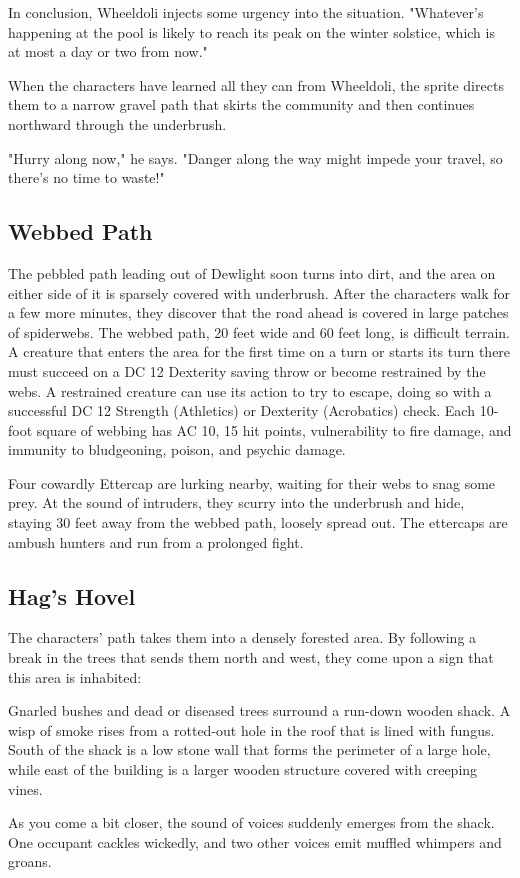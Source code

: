 \documentclass[10pt,a4paper,twoside,bg=print,twocolumn,openany,nodeprecatedcode]{dndbook}
\begin{document}
In conclusion, Wheeldoli injects some urgency into the situation. "Whatever's happening at the pool is likely to reach its peak on the winter solstice, which is at most a day or two from now."

When the characters have learned all they can from Wheeldoli, the sprite directs them to a narrow gravel path that skirts the community and then continues northward through the underbrush.

"Hurry along now," he says. "Danger along the way might impede your travel, so there's no time to waste!"

\subsection{Webbed Path}
The pebbled path leading out of Dewlight soon turns into dirt, and the area on either side of it is sparsely covered with underbrush. After the characters walk for a few more minutes, they discover that the road ahead is covered in large patches of spiderwebs. The webbed path, 20 feet wide and 60 feet long, is difficult terrain. A creature that enters the area for the first time on a turn or starts its turn there must succeed on a DC 12 Dexterity saving throw or become restrained by the webs. A restrained creature can use its action to try to escape, doing so with a successful DC 12 Strength (Athletics) or Dexterity (Acrobatics) check. Each 10-foot square of webbing has AC 10, 15 hit points, vulnerability to fire damage, and immunity to bludgeoning, poison, and psychic damage.

Four cowardly Ettercap are lurking nearby, waiting for their webs to snag some prey. At the sound of intruders, they scurry into the underbrush and hide, staying 30 feet away from the webbed path, loosely spread out. The ettercaps are ambush hunters and run from a prolonged fight.

\subsection{Hag's Hovel}
The characters' path takes them into a densely forested area. By following a break in the trees that sends them north and west, they come upon a sign that this area is inhabited:

\begin{DndReadAloud}{}
Gnarled bushes and dead or diseased trees surround a run-down wooden shack. A wisp of smoke rises from a rotted-out hole in the roof that is lined with fungus. South of the shack is a low stone wall that forms the perimeter of a large hole, while east of the building is a larger wooden structure covered with creeping vines.

As you come a bit closer, the sound of voices suddenly emerges from the shack. One occupant cackles wickedly, and two other voices emit muffled whimpers and groans.

\end{DndReadAloud}
\end{document}
